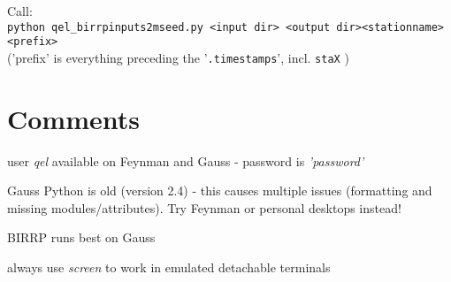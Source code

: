 \documentclass[11pt,DIV=12]{scrartcl}
\begin{document}
Call:\\

\texttt{python qel\_birrpinputs2mseed.py <input dir> <output dir><stationname> <prefix>}\\
('prefix' is everything preceding the '\texttt{.timestamps}', incl. \texttt{staX} )


\section*{Comments}
\begin{itemize*}
\item user \textit{qel} available on Feynman and Gauss - password is \textit{'password'}
\item Gauss Python is old (version 2.4) - this causes multiple issues (formatting and missing modules/attributes). Try Feynman or personal desktops instead!
\item BIRRP runs best on Gauss
\item always use \textit{screen} to  work in emulated detachable terminals
\end{itemize*}
\end{document}
